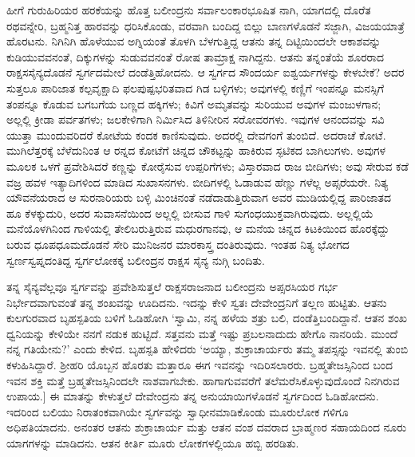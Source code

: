 ಹೀಗೆ ಗುರುಹಿರಿಯರ ಹರಕೆಯನ್ನು ಹೊತ್ತ ಬಲೀಂದ್ರನು ಸರ್ವಾಲಂಕಾರಭೂಷಿತ ನಾಗಿ, ಯಾಗದಲ್ಲಿ ದೊರೆತ ರಥವನ್ನೇರಿ, ಬ್ರಹ್ಮನಿತ್ತ ಹಾರವನ್ನು ಧರಿಸಿಕೊಂಡು, ವರವಾಗಿ ಬಂದಿದ್ದ ಬಿಲ್ಲು ಬಾಣಗಳೊಡನೆ ಸಜ್ಜಾಗಿ, ವಿಜಯಯಾತ್ರೆ ಹೊರಟನು. ನಿಗಿನಿಗಿ ಹೊಳೆಯುವ ಅಗ್ನಿಯಂತೆ ತೊಳಗಿ ಬೆಳಗುತ್ತಿದ್ದ ಆತನು ತನ್ನ ದಿಟ್ಟಿಯಿಂದಲೇ ಆಕಾಶವನ್ನು ಕುಡಿಯುವವನಂತೆ, ದಿಕ್ಕುಗಳನ್ನು ಸುಡುವವನಂತೆ ರೋಷ ತಾಮ್ರಾಕ್ಷ ನಾಗಿದ್ದನು. ಆತನು ತನ್ನಂತೆಯೆ ಶೂರರಾದ ರಾಕ್ಷಸಸೈನ್ಯದೊಡನೆ ಸ್ವರ್ಗದಮೇಲೆ ದಂಡೆತ್ತಿಹೋದನು. ಆ ಸ್ವರ್ಗದ ಸೌಂದರ್ಯ ಐಶ್ವರ್ಯಗಳನ್ನು ಕೇಳಬೇಕೆ? ಅದರ ಸುತ್ತಲೂ ಪಾರಿಜಾತ ಕಲ್ಪವೃಕ್ಷಾದಿ ಫಲಪುಷ್ಪಭರಿತವಾದ ಗಿಡ ಬಳ್ಳಿಗಳು; ಅವುಗಳಲ್ಲಿ ಕಣ್ಣಿಗೆ ಇಂಪನ್ನೂ ಮನಸ್ಸಿಗೆ ತಂಪನ್ನೂ ಕೊಡುವ ಬಗಬಗೆಯ ಬಣ್ಣದ ಹಕ್ಕಿಗಳು; ಕಿವಿಗೆ ಅಮೃತವನ್ನು ಸುರಿಯುವ ಅವುಗಳ ಮಂಜುಳಗಾನ; ಅಲ್ಲಲ್ಲಿ ಕ್ರೀಡಾ ಪರ್ವತಗಳು; ಜಲಕೇಳಿಗಾಗಿ ನಿರ್ಮಿಸಿದ ತಿಳಿನೀರಿನ ಸರೋವರಗಳು. ಇವುಗಳ ಆನಂದವನ್ನು ಸವಿ ಯುತ್ತಾ ಮುಂದುವರಿದರೆ ಕೋಟೆಯ ಕಂದಕ ಕಾಣಿಸುವುದು. ಅದರಲ್ಲಿ ದೇವಗಂಗೆ ತುಂಬಿದೆ. ಅದರಾಚೆ ಕೋಟೆ. ಮುಗಿಲೆತ್ತರಕ್ಕೆ ಬೆಳೆದುನಿಂತ ಆ ರನ್ನದ ಕೋಟೆಗೆ ಚಿನ್ನದ ಚೌಕಟ್ಟನ್ನು ಹಾಕಿರುವ ಸ್ಫಟಿಕದ ಬಾಗಿಲುಗಳು. ಅವುಗಳ ಮೂಲಕ ಒಳಗೆ ಪ್ರವೇಶಿಸಿದರೆ ಕಣ್ಣನ್ನು ಕೋರೈಸುವ ಉಪ್ಪರಿಗೆಗಳು; ವಿಸ್ತಾರವಾದ ರಾಜ ಬೀದಿಗಳು; ಅವು ಸೇರುವ ಕಡೆ ವಜ್ರ ಹವಳ ಇತ್ಯಾದಿಗಳಿಂದ ಮಾಡಿದ ಸುಖಾಸನಗಳು. ಬೀದಿಗಳಲ್ಲಿ ಓಡಾಡುವ ಹೆಣ್ಣು ಗಳೆಲ್ಲ ಅಪ್ಸರೆಯರೇ. ನಿತ್ಯ ಯೌವನೆಯರಾದ ಆ ಸುರನಾರಿಯರು ಬಳ್ಳಿ ಮಿಂಚಿನಂತೆ ನಡೆದಾಡುತ್ತಿರುವಾಗ ಅವರ ಮುಡಿಯಲ್ಲಿದ್ದ ಪಾರಿಜಾತದ ಹೂ ಕೆಳಕ್ಕುದುರಿ, ಅದರ ಸುವಾಸನೆಯಿಂದ ಅಲ್ಲಲ್ಲಿ ಬೀಸುವ ಗಾಳಿ ಸುಗಂಧಯುಕ್ತವಾಗಿರುವುದು. ಅಲ್ಲಲ್ಲಿಯೆ ಮನೆಯೊಳಗಿನಿಂದ ಗಾಳಿಯಲ್ಲಿ ತೇಲಿಬರುತ್ತಿರುವ ಮಧುರಗಾನವು, ಆ ಮನೆಯ ಚಿನ್ನದ ಕಿಟಕಿಯಿಂದ ಹೊರಕ್ಕೆದ್ದು ಬರುವ ಧೂಪಧೂಮದೊಡನೆ ಸೇರಿ ಮುನಿಜನರ ಮಾರಕಾಸ್ತ್ರ ದಂತಿರುವುದು. ಇಂತಹ ನಿತ್ಯ ಭೋಗದ ಸ್ವರ್ಣಸ್ವಪ್ನದಂತಿದ್ದ ಸ್ವರ್ಗಲೋಕಕ್ಕೆ ಬಲೀಂದ್ರನ ರಾಕ್ಷಸ ಸೈನ್ಯ ನುಗ್ಗಿ ಬಂದಿತು.

ತನ್ನ ಸೈನ್ಯವೆಲ್ಲವೂ ಸ್ವರ್ಗವನ್ನು ಪ್ರವೇಶಿಸುತ್ತಲೆ ರಾಕ್ಷಸರಾಜನಾದ ಬಲೀಂದ್ರನು ಅಪ್ಸರಸಿಯರ ಗರ್ಭ ನಿರ್ಭೇದವಾಗುವಂತೆ ತನ್ನ ಶಂಖವನ್ನು ಊದಿದನು. ಇದನ್ನು ಕೇಳಿ ಸ್ವತಃ ದೇವೇಂದ್ರನಿಗೆ ತಲ್ಲಣ ಹುಟ್ಟಿತು. ಆತನು ಕುಲಗುರವಾದ ಬೃಹಸ್ಪತಿಯ ಬಳಿಗೆ ಓಡಿಹೋಗಿ ‘ಸ್ವಾಮಿ, ನನ್ನ ಹಳೆಯ ಶತ್ರು ಬಲಿ, ದಂಡೆತ್ತಿಬಂದಿದ್ದಾನೆ. ಆತನ ಶಂಖ ಧ್ವನಿಯನ್ನು ಕೇಳಿಯೇ ನನಗೆ ನಡುಕ ಹುಟ್ಟಿದೆ. ಸತ್ತವನು ಮತ್ತೆ ಇಷ್ಟು ಪ್ರಬಲನಾದುದು ಹೇಗೊ ನಾನರಿಯೆ. ಮುಂದೆ ನನ್ನ ಗತಿಯೇನು?’ ಎಂದು ಕೇಳಿದ. ಬೃಹಸ್ಪತಿ ಹೇಳಿದರು ‘ಅಯ್ಯಾ, ಶುಕ್ರಾಚಾರ್ಯರು ತಮ್ಮ ತಪಸ್ಸನ್ನು ಇವನಲ್ಲಿ ತುಂಬಿ ಕಳುಹಿಸಿದ್ದಾರೆ. ಶ್ರೀಹರಿ ಯೊಬ್ಬನ ಹೊರತು ಮತ್ತಾರೂ ಈಗ ಇವನನ್ನು ಇದಿರಿಸಲಾರರು. ಬ್ರಹ್ಮತೇಜಸ್ಸಿನಿಂದ ಬಂದ ಇವನ ಶಕ್ತಿ ಮತ್ತೆ ಬ್ರಹ್ಮತೇಜಸ್ಸಿನಿಂದಲೇ ನಾಶವಾಗಬೇಕು. ಹಾಗಾಗುವವರೆಗೆ ತಲೆಮರೆಸಿಕೊಳ್ಳುವುದೊಂದೆ ನಿನಗಿರುವ ಉಪಾಯ.] ಈ ಮಾತನ್ನು ಕೇಳುತ್ತಲೆ ದೇವೇಂದ್ರನು ತನ್ನ ಅನುಯಾಯಿಗಳೊಡನೆ ಸ್ವರ್ಗದಿಂದ ಓಡಿಹೋದನು. ಇದರಿಂದ ಬಲಿಯು ನಿರಾತಂಕವಾಗಿಯೇ ಸ್ವರ್ಗವನ್ನು ಸ್ವಾಧೀನಮಾಡಿಕೊಂಡು ಮೂರುಲೋಕ ಗಳಿಗೂ ಅಧಿಪತಿಯಾದನು. ಅನಂತರ ಆತನು ಶುಕ್ರಾಚಾರ್ಯ ಮತ್ತು ಆತನ ವಂಶ ದವರಾದ ಬ್ರಾಹ್ಮಣರ ಸಹಾಯದಿಂದ ನೂರು ಯಾಗಗಳನ್ನು ಮಾಡಿದನು. ಆತನ ಕೀರ್ತಿ ಮೂರು ಲೋಕಗಳಲ್ಲಿಯೂ ಹಬ್ಬಿ ಹರಡಿತು.

